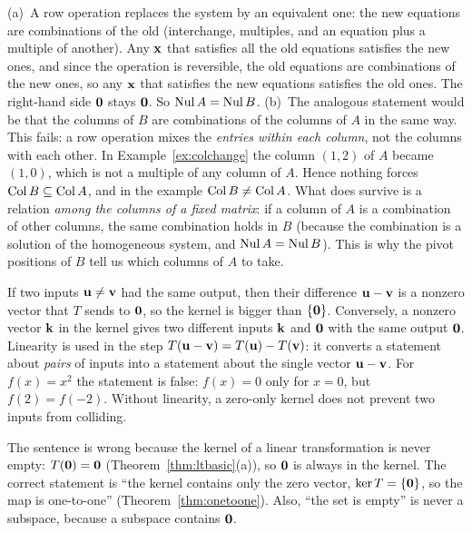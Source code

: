 \documentclass[11pt]{article}
\begin{document}
\begin{description}[leftmargin=0pt,itemsep=5pt]
  \item[Pause and think \ref{think:rowops}.] (a)~A row operation replaces the system by an equivalent one: the new equations are combinations of the old (interchange, multiples, and an equation plus a multiple of another). Any $\mathbf{x}$ that satisfies all the old equations satisfies the new ones, and since the operation is reversible, the old equations are combinations of the new ones, so any $\mathbf{x}$ that satisfies the new equations satisfies the old ones. The right-hand side $\mathbf{0}$ stays $\mathbf{0}$. So $\operatorname{Nul} A=\operatorname{Nul} B$. (b)~The analogous statement would be that the columns of $B$ are combinations of the columns of $A$ in the same way. This fails: a row operation mixes the \emph{entries within each column}, not the columns with each other. In Example~\ref{ex:colchange} the column $(1,2)$ of $A$ became $(1,0)$, which is not a multiple of any column of $A$. Hence nothing forces $\operatorname{Col} B\subseteq\operatorname{Col} A$, and in the example $\operatorname{Col} B\neq\operatorname{Col} A$. What does survive is a relation \emph{among the columns of a fixed matrix}: if a column of $A$ is a combination of other columns, the same combination holds in $B$ (because the combination is a solution of the homogeneous system, and $\operatorname{Nul} A=\operatorname{Nul} B$). This is why the pivot positions of $B$ tell us which columns of $A$ to take.
  \item[Pause and think \ref{think:onetoone}.] If two inputs $\mathbf{u}\neq\mathbf{v}$ had the same output, then their difference $\mathbf{u}-\mathbf{v}$ is a nonzero vector that $T$ sends to $\mathbf{0}$, so the kernel is bigger than $\{\mathbf{0}\}$. Conversely, a nonzero vector $\mathbf{k}$ in the kernel gives two different inputs $\mathbf{k}$ and $\mathbf{0}$ with the same output $\mathbf{0}$. Linearity is used in the step $T(\mathbf{u}-\mathbf{v})=T(\mathbf{u})-T(\mathbf{v})$: it converts a statement about \emph{pairs} of inputs into a statement about the single vector $\mathbf{u}-\mathbf{v}$. For $f(x)=x^2$ the statement is false: $f(x)=0$ only for $x=0$, but $f(2)=f(-2)$. Without linearity, a zero-only kernel does not prevent two inputs from colliding.
  \item[Pause and think \ref{think:empty}.] The sentence is wrong because the kernel of a linear transformation is never empty: $T(\mathbf{0})=\mathbf{0}$ (Theorem~\ref{thm:ltbasic}(a)), so $\mathbf{0}$ is always in the kernel. The correct statement is ``the kernel contains only the zero vector, $\ker T=\{\mathbf{0}\}$, so the map is one-to-one'' (Theorem~\ref{thm:onetoone}). Also, ``the set is empty'' is never a subspace, because a subspace contains $\mathbf{0}$.

\end{description}
\end{document}
